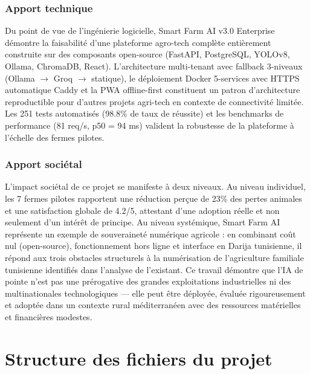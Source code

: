 \documentclass[12pt,a4paper,twoside]{report}
\newcounter{hi}
\begin{document}
\subsection*{Apport technique}
Du point de vue de l'ingénierie logicielle, Smart Farm AI v3.0 Enterprise
démontre la faisabilité d'une plateforme agro-tech complète entièrement
construite sur des composants open-source (FastAPI, PostgreSQL, YOLOv8,
Ollama, ChromaDB, React). L'architecture multi-tenant avec fallback
3-niveaux (Ollama $\rightarrow$ Groq $\rightarrow$ statique), le déploiement Docker 5-services
avec HTTPS automatique Caddy et la PWA offline-first constituent un patron
d'architecture reproductible pour d'autres projets agri-tech en contexte
de connectivité limitée. Les 251 tests automatisés (98.8\% de taux de
réussite) et les benchmarks de performance (81 req/s, p50 = 94 ms) valident
la robustesse de la plateforme à l'échelle des fermes pilotes.

\subsection*{Apport sociétal}
L'impact sociétal de ce projet se manifeste à deux niveaux. Au niveau
individuel, les 7 fermes pilotes rapportent une réduction perçue de 23\%
des pertes animales et une satisfaction globale de 4.2/5, attestant d'une
adoption réelle et non seulement d'un intérêt de principe. Au niveau systémique,
Smart Farm AI représente un exemple de souveraineté numérique agricole :
en combinant coût nul (open-source), fonctionnement hors ligne et interface
en Darija tunisienne, il répond aux trois obstacles structurels à la
numérisation de l'agriculture familiale tunisienne identifiés dans l'analyse
de l'existant. Ce travail démontre que l'IA de pointe n'est pas une prérogative
des grandes exploitations industrielles ni des multinationales technologiques —
elle peut être déployée, évaluée rigoureusement et adoptée dans un contexte
rural méditerranéen avec des ressources matérielles et financières modestes.

\appendix

\chapter{Structure des fichiers du projet}
\label{ann:structure}
\end{document}
